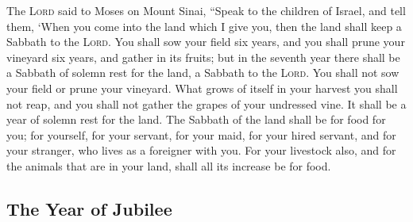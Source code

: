  The \textsc{Lord} said to Moses on Mount Sinai,
 ``Speak to the children of Israel, and tell them, `When
you come into the land which I give you, then the land shall keep a
Sabbath to the \textsc{Lord}.  You shall sow your field
six years, and you shall prune your vineyard six years, and gather in
its fruits;  but in the seventh year there shall be a
Sabbath of solemn rest for the land, a Sabbath to the \textsc{Lord}. You
shall not sow your field or prune your vineyard.  What
grows of itself in your harvest you shall not reap, and you shall not
gather the grapes of your undressed vine. It shall be a year of solemn
rest for the land.  The Sabbath of the land shall be for
food for you; for yourself, for your servant, for your maid, for your
hired servant, and for your stranger, who lives as a foreigner with you.
 For your livestock also, and for the animals that are in
your land, shall all its increase be for food.

\hypertarget{the-year-of-jubilee}{%
\subsection{The Year of Jubilee}\label{the-year-of-jubilee}}

